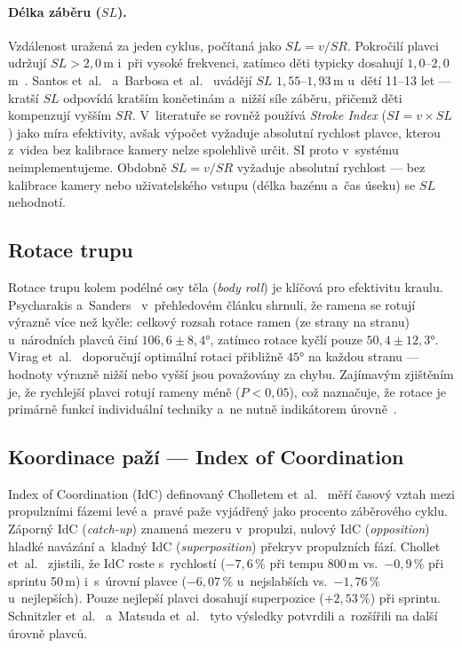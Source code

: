 \paragraph{Délka záběru ($SL$).} Vzdálenost uražená za jeden cyklus, počítaná jako $SL = v / SR$. Pokročilí plavci udržují $SL > 2{,}0$\,m i~při vysoké frekvenci, zatímco děti typicky dosahují $1{,}0$--$2{,}0$\,m~\cite{barbosa2019,santos2023}. Santos et~al.~\cite{santos2023} a~Barbosa et~al.~\cite{barbosa2019} uvádějí $SL$ $1{,}55$--$1{,}93$\,m u~dětí 11--13 let --- kratší $SL$ odpovídá kratším končetinám a~nižší síle záběru, přičemž děti kompenzují vyšším $SR$. V~literatuře se rovněž používá \textit{Stroke Index} ($SI = v \times SL$) jako míra efektivity, avšak výpočet vyžaduje absolutní rychlost plavce, kterou z~videa bez kalibrace kamery nelze spolehlivě určit. SI proto v~systému neimplementujeme. Obdobně $SL = v / SR$ vyžaduje absolutní rychlost --- bez kalibrace kamery nebo uživatelského vstupu (délka bazénu a~čas úseku) se $SL$ nehodnotí.

\subsection{Rotace trupu}
\label{subsec:rotace}

Rotace trupu kolem podélné osy těla (\textit{body roll}) je klíčová pro efektivitu kraulu. Psycharakis a~Sanders~\cite{psycharakis2010} v~přehledovém článku shrnuli, že ramena se rotují výrazně více než kyčle: celkový rozsah rotace ramen (ze strany na stranu) u~národních plavců činí $106{,}6 \pm 8{,}4°$, zatímco rotace kyčlí pouze $50{,}4 \pm 12{,}3°$. Virag et~al.~\cite{virag2014} doporučují optimální rotaci přibližně $45°$ na každou stranu --- hodnoty výrazně nižší nebo vyšší jsou považovány za chybu. Zajímavým zjištěním je, že rychlejší plavci rotují rameny méně ($P < 0{,}05$), což naznačuje, že rotace je primárně funkcí individuální techniky a~ne nutně indikátorem úrovně~\cite{psycharakis2010}.

\subsection{Koordinace paží --- Index of Coordination}
\label{subsec:idc}

Index of Coordination (IdC) definovaný Cholletem et~al.~\cite{chollet2000} měří časový vztah mezi propulzními fázemi levé a~pravé paže vyjádřený jako procento záběrového cyklu. Záporný IdC (\textit{catch-up}) znamená mezeru v~propulzi, nulový IdC (\textit{opposition}) hladké navázání a~kladný IdC (\textit{superposition}) překryv propulzních fází. Chollet et~al.~\cite{chollet2000} zjistili, že IdC roste s~rychlostí ($-7{,}6\,\%$ při tempu 800\,m vs.\ $-0{,}9\,\%$ při sprintu 50\,m) i~s~úrovní plavce ($-6{,}07\,\%$ u~nejslabších vs.\ $-1{,}76\,\%$ u~nejlepších). Pouze nejlepší plavci dosahují superpozice ($+2{,}53\,\%$) při sprintu. Schnitzler et~al.~\cite{schnitzler2021} a~Matsuda et~al.~\cite{matsuda2014} tyto výsledky potvrdili a~rozšířili na další úrovně plavců.

